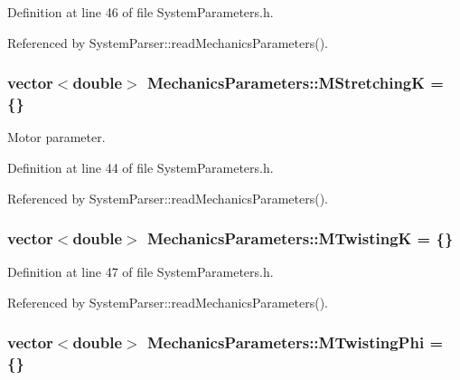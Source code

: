 Definition at line 46 of file System\+Parameters.\+h.



Referenced by System\+Parser\+::read\+Mechanics\+Parameters().

\hypertarget{structMechanicsParameters_a36650ee6fc8a98f94b6594e67d4b34f5}{
\subsubsection[{M\+Stretching\+K}]{\setlength{\rightskip}{0pt plus 5cm}vector$<$double$>$ Mechanics\+Parameters\+::\+M\+Stretching\+K = \{\}}}\label{structMechanicsParameters_a36650ee6fc8a98f94b6594e67d4b34f5}


Motor parameter. 



Definition at line 44 of file System\+Parameters.\+h.



Referenced by System\+Parser\+::read\+Mechanics\+Parameters().

\hypertarget{structMechanicsParameters_a3efad448cc6428dcb081d2778655ec12}{
\subsubsection[{M\+Twisting\+K}]{\setlength{\rightskip}{0pt plus 5cm}vector$<$double$>$ Mechanics\+Parameters\+::\+M\+Twisting\+K = \{\}}}\label{structMechanicsParameters_a3efad448cc6428dcb081d2778655ec12}


Definition at line 47 of file System\+Parameters.\+h.



Referenced by System\+Parser\+::read\+Mechanics\+Parameters().

\hypertarget{structMechanicsParameters_abff44b81c046945ed8277a522b741ac8}{
\subsubsection[{M\+Twisting\+Phi}]{\setlength{\rightskip}{0pt plus 5cm}vector$<$double$>$ Mechanics\+Parameters\+::\+M\+Twisting\+Phi = \{\}}}\label{structMechanicsParameters_abff44b81c046945ed8277a522b741ac8}


